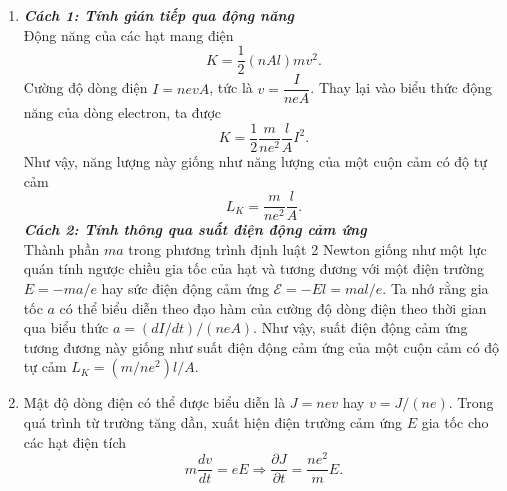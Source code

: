 \begin{enumerate}
    \item \textbf{ \textit{Cách 1: Tính gián tiếp qua động năng}} \\
    Động năng của các hạt mang điện
    \begin{equation} \label{eq1_Kinetic_Inductance}
        K= \dfrac{1}{2} (n A l) m v^2.
    \end{equation}
    Cường độ dòng điện $I=nev A$, tức là $v=\dfrac{I}{neA}$. Thay lại vào biểu thức động năng của dòng electron, ta được
    \begin{equation} \label{eq2_Kinetic_Inductance}
        K = \dfrac{1}{2} \dfrac{m}{ne^2} \dfrac{l}{A} I^2.
    \end{equation}
    Như vậy, năng lượng này giống như năng lượng của một cuộn cảm có độ tự cảm
    \begin{equation} \label{eq3_Kinetic_Inductance}
        L_K = \dfrac{m}{ne^2} \dfrac{l}{A}.
    \end{equation}
    \textbf{\textit{Cách 2: Tính thông qua suất điện động cảm ứng}} \\
    Thành phần $ma$ trong phương trình định luật 2 Newton giống như một lực quán tính ngược chiều gia tốc của hạt và tương đương với một điện trường $E=-ma/e$ hay sức điện động cảm ứng $ \mathcal{E} = -El = mal/e$. Ta nhớ rằng gia tốc $a$ có thể biểu diễn theo đạo hàm của cường độ dòng điện theo thời gian qua biểu thức $a=(dI/dt)/(neA)$. Như vậy, suất điện động cảm ứng tương đương này giống như suất điện động cảm ứng của một cuộn cảm có độ tự cảm $L_K=(m/ne^2)l/A$.
    \item Mật độ dòng điện có thể được biểu diễn là $J=nev$ hay $v=J/(ne)$. Trong quá trình từ trường tăng dần, xuất hiện điện trường cảm ứng $E$ gia tốc cho các hạt điện tích
    \begin{equation} \label{eq4_Kinetic_Inductance}
        m \dfrac{dv}{dt} = e E \Rightarrow \dfrac{\partial J}{\partial t} = \dfrac{n e^2}{m} E.
    \end{equation}
    

\end{enumerate}

